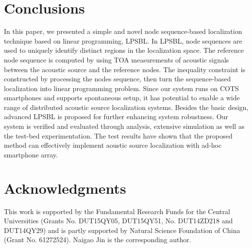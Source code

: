 
\section{Conclusions}

In this paper, we presented a simple and novel node sequence-based localization technique based on linear programming, LPSBL. 
In LPSBL, node sequences are used to uniquely identify distinct regions in the localization space. 
The reference node sequence is computed by using TOA measurements of acoustic signals between the acoustic source and the reference nodes.
The inequality constraint is constructed by processing the nodes sequence, then turn the sequence-based localization into linear programming problem. 
Since our system runs on COTS smartphones and supports spontaneous setup, 
 it has potential to enable a wide range of distributed acoustic source localization systems. 
 Besides the basic design, advanced LPSBL is proposed for further enhancing system robustness.
 Our system is verified and evaluated through analysis, extensive simulation as well as the test-bed experimentation.
 The test results have shown that the proposed method can effectively implement aoustic source localization with ad-hoc smartphone array.

\section*{Acknowledgments}
This work is supported by the Fundamental Research Funds for the Central Universities (Grants No. DUT15QY05, DUT15QY51, No. DUT14ZD218 and DUT14QY29) and is partly supported by Natural Science Foundation of China (Grant No. 61272524).  Naigao Jin is the corresponding author.

